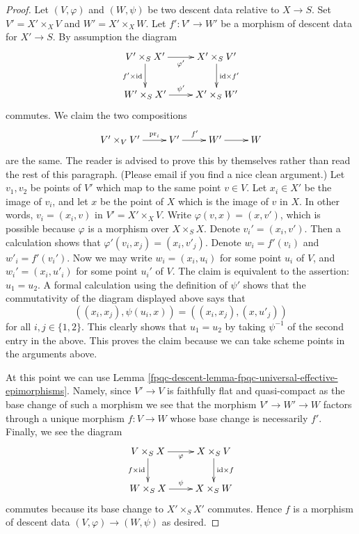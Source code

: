 \begin{proof}
Let $(V, \varphi)$ and $(W, \psi)$ be two descent data relative
to $X \to S$. Set $V' = X' \times_X V$ and $W' = X' \times_X W$.
Let $f' : V' \to W'$ be a morphism of descent data for $X' \to S$.
By assumption the diagram
$$
\xymatrix{
V' \times_S X' \ar[r]_{\varphi'} \ar[d]_{f' \times \text{id}} &
X' \times_S V' \ar[d]^{\text{id} \times f'} \\
W' \times_S X' \ar[r]^{\psi'} & X' \times_S W'
}
$$
commutes. We claim the two compositions
$$
\xymatrix{
V' \times_V V' \ar[r]^-{\text{pr}_i} &
V' \ar[r]^{f'} &
W' \ar[r] &
W
}
$$
are the same. The reader is advised to prove this by themselves rather
than read the rest of this paragraph. (Please email if you find a 
nice clean argument.) Let $v_1, v_2$ be points of $V'$ which map to the same
point $v \in V$. Let $x_i \in X'$ be the image of $v_i$, and let
$x$ be the point of $X$ which is the image of $v$ in $X$. In other words,
$v_i = (x_i, v)$ in $V' = X' \times_X V$. Write
$\varphi(v, x) = (x, v')$, which is possible because $\varphi$ is
a morphism over $X \times_S X$. Denote
$v_i' = (x_i, v')$. Then a calculation shows that
$\varphi'(v_i, x_j) = (x_i, v'_j)$. Denote
$w_i = f'(v_i)$ and $w'_i = f'(v_i')$.
Now we may write $w_i = (x_i, u_i)$ for some point $u_i$ of $V$,
and $w_i' = (x_i, u'_i)$ for some point $u_i'$ of $V$.
The claim is equivalent to the assertion: $u_1 = u_2$.
A formal calculation using the definition of $\psi'$ shows
that the commutativity of the diagram displayed above says that
$$
((x_i, x_j), \psi(u_i, x)) = ((x_i, x_j), (x, u'_j))
$$
for all $i, j \in \{1, 2\}$. This clearly shows that
$u_1 = u_2$ by taking $\psi^{-1}$ of the second entry
in the above. This proves the claim because we can take
scheme points in the arguments above.

\medskip\noindent
At this point we can use
Lemma \ref{fpqc-descent-lemma-fpqc-universal-effective-epimorphisms}.
Namely, since $V' \to V$ is faithfully flat and quasi-compact as
the base change of such a morphism we see that the morphism
$V' \to W' \to W$ factors through a unique morphism $f : V \to W$
whose base change is necessarily $f'$.
Finally, we see the diagram
$$
\xymatrix{
V \times_S X \ar[r]_{\varphi} \ar[d]_{f \times \text{id}} &
X \times_S V \ar[d]^{\text{id} \times f} \\
W \times_S X \ar[r]^{\psi} & X \times_S W
}
$$
commutes because its base change to $X' \times_S X'$ commutes.
Hence $f$ is a morphism of descent data $(V, \varphi) \to (W, \psi)$
as desired.
\end{proof}


